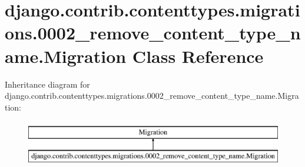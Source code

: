 \hypertarget{classdjango_1_1contrib_1_1contenttypes_1_1migrations_1_10002__remove__content__type__name_1_1_migration}{}\section{django.\+contrib.\+contenttypes.\+migrations.0002\+\_\+remove\+\_\+content\+\_\+type\+\_\+name.Migration Class Reference}
\label{classdjango_1_1contrib_1_1contenttypes_1_1migrations_1_10002__remove__content__type__name_1_1_migration}
Inheritance diagram for django.\+contrib.\+contenttypes.\+migrations.0002\+\_\+remove\+\_\+content\+\_\+type\+\_\+name.Migration\+:\begin{figure}[H]
\begin{center}
\leavevmode
\includegraphics[height=2.000000cm]{classdjango_1_1contrib_1_1contenttypes_1_1migrations_1_10002__remove__content__type__name_1_1_migration}
\end{center}
\end{figure}
